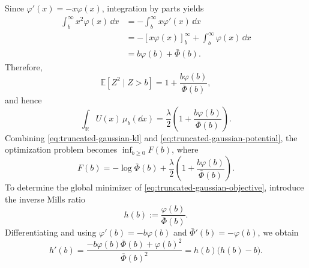 \documentclass[12pt,a4paper,oneside]{book}
\begin{document}
\begin{example}
\begin{solution}
Since $\varphi'(x)=-x\varphi(x)$, integration by parts yields
\begin{equation*}
\begin{aligned}
    \int_b^\infty x^2\varphi(x)\,\dd x &= -\int_b^\infty x\varphi'(x)\,\dd x\\
    &= -\left[x\varphi(x)\right]_b^\infty + \int_b^\infty\varphi(x)\,\dd x\\
    &= b\varphi(b)+\bar\Phi(b).
\end{aligned}
\end{equation*}
Therefore,
\begin{equation*}
    \mathbb E[Z^2\mid Z>b] = 1+\frac{b\varphi(b)}{\bar\Phi(b)},
\end{equation*}
and hence
\begin{equation}
        \int_{\mathbb R}U(x)\,\mu_b(\dd x) = \frac{\lambda}{2}
        \left(
            1+\frac{b\varphi(b)}{\bar\Phi(b)}
        \right).
    \label{eq:truncated-gaussian-potential}
\end{equation}
Combining \eqref{eq:truncated-gaussian-kl} and \eqref{eq:truncated-gaussian-potential}, the optimization problem becomes
$\inf_{b\geq0}F(b)$, where
\begin{equation}
    F(b) = -\log\bar\Phi(b) + \frac{\lambda}{2}
        \left(
            1+\frac{b\varphi(b)}{\bar\Phi(b)}
        \right).
    \label{eq:truncated-gaussian-objective}
\end{equation}
To determine the global minimizer of \eqref{eq:truncated-gaussian-objective}, introduce the inverse Mills ratio
\begin{equation*}
    h(b):=\frac{\varphi(b)}{\bar\Phi(b)}.
\end{equation*}
Differentiating and using $\varphi'(b)=-b\varphi(b)$ and $\bar\Phi'(b)=-\varphi(b)$, we obtain
\begin{equation*}
    h'(b) = \frac{-b\varphi(b)\bar\Phi(b)+\varphi(b)^2} {\bar\Phi(b)^2} = h(b)\bigl(h(b)-b\bigr).
\end{equation*}


\end{solution}
\end{example}
\end{document}
